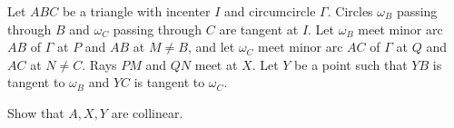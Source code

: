 Let $ABC$ be a triangle with incenter $I$ and circumcircle $\Gamma$. Circles $\omega_{B}$ passing through $B$ and $\omega_{C}$ passing through $C$ are tangent at $I$. Let $\omega_{B}$ meet minor arc $AB$ of $\Gamma$ at $P$ and $AB$ at $M\neq B$, and let $\omega_{C}$ meet minor arc $AC$ of $\Gamma$ at $Q$ and $AC$ at $N\neq C$. Rays $PM$ and $QN$ meet at $X$. Let $Y$ be a point such that $YB$ is tangent to $\omega_{B}$ and $YC$ is tangent to $\omega_{C}$.

Show that $A,X,Y$ are collinear.